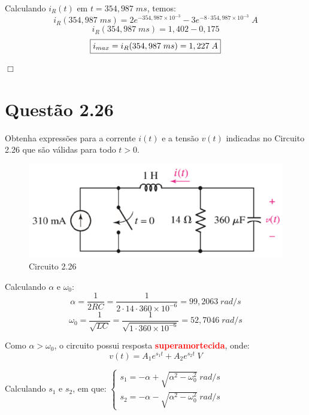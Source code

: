 \documentclass[
	12pt,				%
	oneside,			%
	a4paper,			%
	english,			%
	french,				%
	spanish,			%
	brazil				%
	]{abntex2}
\begin{document}
Calculando  $i_R(t)$ em $t=354,987\;ms$, temos:
$$i_R(354,987\;ms) = 2e^{-354,987\times10^{-3}}-3e^{-8\cdot354,987\times10^{-3}}\;A$$
$$i_R(354,987\;ms) = 1,402 - 0,175$$
\begin{equation}
    \centering
    \fbox{$i_{max} = i_R(354,987\;ms) = 1,227\;A$}
\end{equation}

\begin{flushright}
    $\Box$
\end{flushright}

\newpage


\section*{Questão 2.26}
Obtenha expressões para a corrente $i(t)$ e a tensão $v(t)$ indicadas no Circuito 2.26 que são válidas para todo $t > 0$. 
\begin{figure}[htb]
	\centering
	\includegraphics[scale=0.65]{2-26.PNG}
	\caption{Circuito 2.26}
\end{figure}

Calculando $\alpha$ e $\omega_0$:
$$\alpha = \dfrac{1}{2RC} = \dfrac{1}{2\cdot14\cdot360\times10^{-6}} = 99,2063 \;rad/s$$
$$\omega_0 = \dfrac{1}{\sqrt{LC}} = \dfrac{1}{\sqrt{1\cdot360\times10^{-6}}} = 52,7046 \;rad/s$$

Como  $\alpha > \omega_0$, o circuito possui resposta \textbf{\textcolor{red}{superamortecida}}, onde: 
$$v(t)=A_1e^{s_1t} + A_2e^{s_2t}\;V$$

Calculando $s_1$ e $s_2$, em que:
$\begin{cases}
    s_1=-\alpha + \sqrt{\alpha^2-\omega_0^2}\;rad/s\\
    s_2=-\alpha - \sqrt{\alpha^2-\omega_0^2}\;rad/s
\end{cases}$
\end{document}
